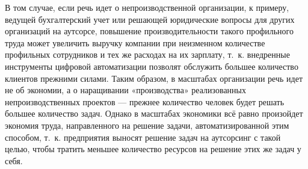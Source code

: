 \documentclass{article}
\begin{document}
В том случае, если речь идет о непроизводственной организации, к примеру, ведущей бухгалтерский учет или решающей юридические вопросы для других организаций на аутсорсе, повышение производительности такого профильного труда может увеличить выручку компании при неизменном количестве профильных сотрудников и тех же расходах на их зарплату, т.~к. внедренные инструменты цифровой автоматизации позволят обслужить большее количество клиентов прежними силами. Таким образом, в масштабах организации речь идет не об экономии, а о наращивании «производства» реализованных непроизводственных проектов — прежнее количество человек будет решать большее количество задач. Однако в масштабах экономики всё равно произойдет экономия труда, направленного на решение задачи, автоматизированной этим способом, т.~к. предприятия выносят решение задач на аутсорсинг с такой целью, чтобы тратить меньшее количество ресурсов на решение этих же задач у себя.
\end{document}
